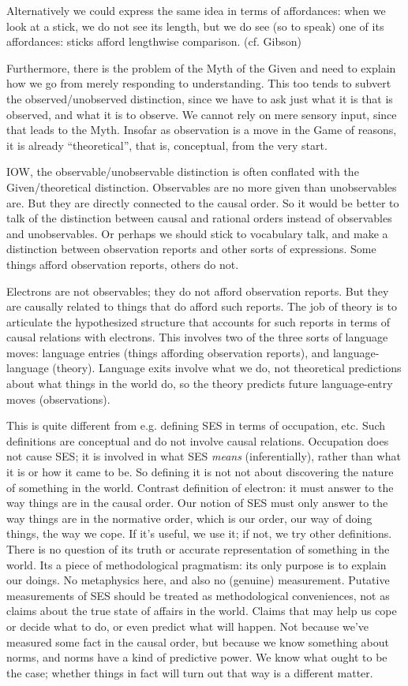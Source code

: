 \documentclass[11pt,twoside]{article}
\begin{document}
Alternatively we could express the same idea in terms of affordances:
when we look at a stick, we do not see its length, but we do see (so
to speak) one of its affordances: sticks afford lengthwise
comparison. (cf. Gibson)

Furthermore, there is the problem of the Myth of the Given and need to
explain how we go from merely responding to understanding.  This too
tends to subvert the observed/unobserved distinction, since we have to
ask just what it is that is observed, and what it is to observe.  We
cannot rely on mere sensory input, since that leads to the Myth.
Insofar as observation is a move in the Game of reasons, it is already
``theoretical'', that is, conceptual, from the very start.

IOW, the observable/unobservable distinction is often conflated with
the Given/theoretical distinction.  Observables are no more given than
unobservables are.  But they are directly connected to the causal
order.  So it would be better to talk of the distinction between
causal and rational orders instead of observables and unobservables.
Or perhaps we should stick to vocabulary talk, and make a distinction
between observation reports and other sorts of expressions.  Some
things afford observation reports, others do not.

Electrons are not observables; they do not afford observation reports.
But they are causally related to things that do afford such reports.
The job of theory is to articulate the hypothesized structure that
accounts for such reports in terms of causal relations with electrons.
This involves two of the three sorts of language moves: language
entries (things affording observation reports), and language-language
(theory).  Language exits involve what we do, not theoretical
predictions about what things in the world do, so the theory predicts
future language-entry moves (observations).

This is quite different from e.g. defining SES in terms of occupation,
etc.  Such definitions are conceptual and do not involve causal
relations.  Occupation does not cause SES; it is involved in what SES
\textit{means} (inferentially), rather than what it is or how it came to
be.  So defining it is not not about discovering the nature of
something in the world.  Contrast definition of electron: it must
answer to the way things are in the causal order.  Our notion of SES
must only answer to the way things are in the normative order, which
is our order, our way of doing things, the way we cope.  If it's
useful, we use it; if not, we try other definitions.  There is no
question of its truth or accurate representation of something in the
world.  Its a piece of methodological pragmatism: its only purpose is
to explain our doings.  No metaphysics here, and also no (genuine)
measurement.  Putative measurements of SES should be treated as
methodological conveniences, not as claims about the true state of
affairs in the world.  Claims that may help us cope or decide what to
do, or even predict what will happen.  Not because we've measured some
fact in the causal order, but because we know something about norms,
and norms have a kind of predictive power.  We know what ought to be
the case; whether things in fact will turn out that way is a different
matter.
\end{document}
